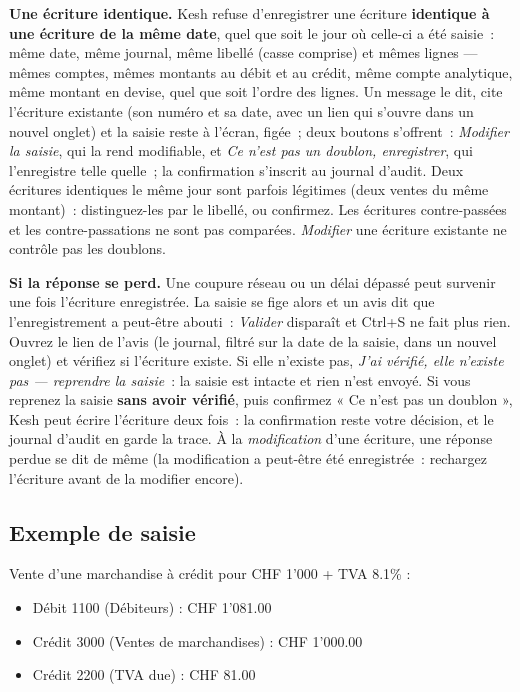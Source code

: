 \documentclass[a4paper,11pt,oneside]{article}
\begin{document}
\textbf{Une écriture identique.} Kesh refuse d'enregistrer une écriture \textbf{identique à une
écriture de la même date}, quel que soit le jour où celle-ci a été saisie~: même date, même journal, même libellé (casse comprise)
et mêmes lignes --- mêmes comptes, mêmes montants au débit et au crédit, même compte analytique, même montant
en devise, quel que soit l'ordre des lignes. Un message le dit, cite l'écriture existante (son
numéro et sa date, avec un lien qui s'ouvre dans un nouvel onglet) et la saisie reste à l'écran,
figée~; deux boutons s'offrent~: \emph{Modifier la saisie}, qui la rend modifiable, et \emph{Ce
n'est pas un doublon, enregistrer}, qui l'enregistre telle quelle~; la confirmation s'inscrit au
journal d'audit. Deux écritures identiques le même jour sont parfois légitimes (deux ventes du même
montant)~: distinguez-les par le libellé, ou confirmez. Les écritures contre-passées et les
contre-passations ne sont pas comparées. \emph{Modifier} une écriture existante ne contrôle pas les
doublons.

\textbf{Si la réponse se perd.} Une coupure réseau ou un délai dépassé peut survenir une fois
l'écriture enregistrée. La saisie se fige alors et un avis dit que l'enregistrement a peut-être
abouti~: \emph{Valider} disparaît et Ctrl+S ne fait plus rien. Ouvrez le lien de l'avis (le journal, filtré sur
la date de la saisie, dans un nouvel onglet) et vérifiez si l'écriture existe. Si elle n'existe pas,
\emph{J'ai vérifié, elle n'existe pas --- reprendre la saisie}~: la saisie est intacte et rien n'est
envoyé. Si vous reprenez la saisie \textbf{sans avoir vérifié}, puis confirmez « Ce n'est pas un
doublon », Kesh peut écrire l'écriture deux fois~: la confirmation reste votre décision, et le journal
d'audit en garde la trace. À la \emph{modification} d'une écriture, une réponse perdue se dit de même
(la modification a peut-être été enregistrée~: rechargez l'écriture avant de la modifier encore).

\subsection{Exemple de saisie}

Vente d'une marchandise à crédit pour CHF 1'000 + TVA 8.1\% :

\begin{itemize}
    \item Débit 1100 (Débiteurs) : CHF 1'081.00
    \item Crédit 3000 (Ventes de marchandises) : CHF 1'000.00
    \item Crédit 2200 (TVA due) : CHF 81.00
\end{itemize}
\end{document}
